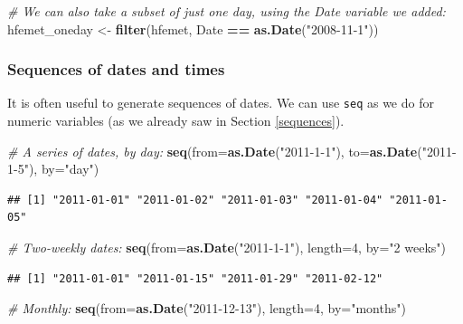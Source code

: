 \documentclass[]{book}
\newenvironment{Shaded}{\begin{snugshade}}{\end{snugshade}}
\newcommand{\CommentTok}[1]{\textcolor[rgb]{0.56,0.35,0.01}{\textit{#1}}}
\newcommand{\DataTypeTok}[1]{\textcolor[rgb]{0.13,0.29,0.53}{#1}}
\newcommand{\DecValTok}[1]{\textcolor[rgb]{0.00,0.00,0.81}{#1}}
\newcommand{\KeywordTok}[1]{\textcolor[rgb]{0.13,0.29,0.53}{\textbf{#1}}}
\newcommand{\NormalTok}[1]{#1}
\newcommand{\OperatorTok}[1]{\textcolor[rgb]{0.81,0.36,0.00}{\textbf{#1}}}
\newcommand{\StringTok}[1]{\textcolor[rgb]{0.31,0.60,0.02}{#1}}
\begin{document}
\begin{Shaded}
\begin{Highlighting}[]
\CommentTok{# We can also take a subset of just one day, using the Date variable we added:}
\NormalTok{hfemet_oneday <-}\StringTok{ }\KeywordTok{filter}\NormalTok{(hfemet, Date }\OperatorTok{==}\StringTok{ }\KeywordTok{as.Date}\NormalTok{(}\StringTok{"2008-11-1"}\NormalTok{))}
\end{Highlighting}
\end{Shaded}

\hypertarget{seqdates}{%
\subsubsection{Sequences of dates and times}\label{seqdates}}

It is often useful to generate sequences of dates. We can use \texttt{seq} as we do for numeric variables (as we already saw in Section \ref{sequences}).

\begin{Shaded}
\begin{Highlighting}[]
\CommentTok{# A series of dates, by day:}
\KeywordTok{seq}\NormalTok{(}\DataTypeTok{from=}\KeywordTok{as.Date}\NormalTok{(}\StringTok{"2011-1-1"}\NormalTok{), }\DataTypeTok{to=}\KeywordTok{as.Date}\NormalTok{(}\StringTok{"2011-1-5"}\NormalTok{), }\DataTypeTok{by=}\StringTok{"day"}\NormalTok{)}
\end{Highlighting}
\end{Shaded}

\begin{verbatim}
## [1] "2011-01-01" "2011-01-02" "2011-01-03" "2011-01-04" "2011-01-05"
\end{verbatim}

\begin{Shaded}
\begin{Highlighting}[]
\CommentTok{# Two-weekly dates:}
\KeywordTok{seq}\NormalTok{(}\DataTypeTok{from=}\KeywordTok{as.Date}\NormalTok{(}\StringTok{"2011-1-1"}\NormalTok{), }\DataTypeTok{length=}\DecValTok{4}\NormalTok{, }\DataTypeTok{by=}\StringTok{"2 weeks"}\NormalTok{)}
\end{Highlighting}
\end{Shaded}

\begin{verbatim}
## [1] "2011-01-01" "2011-01-15" "2011-01-29" "2011-02-12"
\end{verbatim}

\begin{Shaded}
\begin{Highlighting}[]
\CommentTok{# Monthly:}
\KeywordTok{seq}\NormalTok{(}\DataTypeTok{from=}\KeywordTok{as.Date}\NormalTok{(}\StringTok{"2011-12-13"}\NormalTok{), }\DataTypeTok{length=}\DecValTok{4}\NormalTok{, }\DataTypeTok{by=}\StringTok{"months"}\NormalTok{)}
\end{Highlighting}
\end{Shaded}
\end{document}
